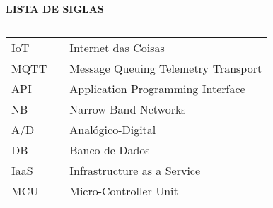 \newpage

\begin{center}
\textbf{LISTA DE SIGLAS}
\end{center}
$\!$\\

\begin{tabular}{lll}
IoT & \hspace{1cm} & Internet das Coisas \\
MQTT & \hspace{1cm} & Message Queuing Telemetry Transport \\
API & \hspace{1cm} & Application Programming Interface \\
NB &\hspace{1cm} &  Narrow Band Networks \\
A/D & \hspace{1cm} & Analógico-Digital \\
DB &  \hspace{1cm} & Banco de Dados \\
IaaS & \hspace{1cm} & Infrastructure as a Service \\
MCU & \hspace{1cm} & Micro-Controller Unit \\
\end{tabular}
